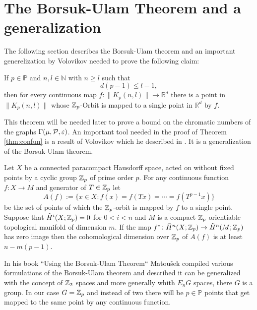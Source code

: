 \section{The Borsuk-Ulam Theorem and a generalization}\label{sec:borsuk}

The following section describes the Borsuk-Ulam theorem and an important generelization by Volovikov needed to prove the following claim:
\begin{thm}\label{thm:confun}
  If $p \in \mathbb{P}$ and $n, l \in \mathbb{N}$ with $n \geq l$ such that
  \begin{equation*}
    d(p-1) \leq l-1,
  \end{equation*}
  then for every continuous map $f\colon\lVert K_p(n,l)\rVert \to \mathbb{R}^d$ there is a point in $\lVert K_p(n,l)\rVert$ whose $\Z_p$-Orbit is mapped to a single point in $\mathbb{R}^d$ by $f$.
\end{thm}
This theorem will be needed later to prove a bound on the chromatic numbers of the graphs $\Gamma(\mu, \P, \varepsilon)$.
An important tool needed in the proof of Theorem \ref{thm:confun} is a result of Volovikov which he described in \cite{vol1980}. It is a generalization of the Borsuk-Ulam theorem.
\begin{lemma}\label{lem:vol}
  Let $X$ be a connected paracompact Hausdorff space, acted on without fixed points by a cyclic group $\Z_p$ of prime order $p$. For any continuous function $f\colon X \to M$ and generator of $T \in \Z_p$ let
  \begin{equation*}
    A(f) := \{x\in X\colon f(x) = f(Tx) = \cdots = f(T^{p-1}x)\}
  \end{equation*}
  be the set of points of which the $\Z_p$-orbit is mapped by $f$ to a single point. Suppose that $\tilde{H}^i(X; \Z_p) = 0$ for $0 < i < n$ and $M$ is a compact $\Z_p$ orientiable topological manifold of dimension $m$. If the map $f^*\colon \tilde{H}^n(X; \Z_p) \to \tilde{H}^n(M; \Z_p)$ has zero image then the cohomological dimension over $\Z_p$ of $A(f)$ is at least $n-m(p-1)$. 
\end{lemma}

In his book ``Using the Borsuk-Ulam Theorem`` \cite{using2003} Matoušek compiled various formulations of the Borsuk-Ulam theorem and described it can be generalized with the concept of $\Z_2$ spaces and more generally whith $E_nG$ spaces, there $G$ is a group. In our case $G = \Z_p$ and instead of two there will be $p \in \mathbb{P}$ points that get mapped to the same point by any continuous function. 

